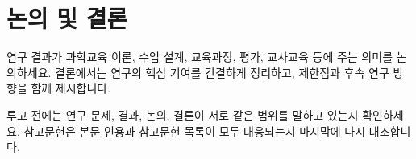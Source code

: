 \section{논의 및 결론}

연구 결과가 과학교육 이론, 수업 설계, 교육과정, 평가, 교사교육 등에 주는 의미를 논의하세요. 결론에서는 연구의 핵심 기여를 간결하게 정리하고, 제한점과 후속 연구 방향을 함께 제시합니다.

투고 전에는 연구 문제, 결과, 논의, 결론이 서로 같은 범위를 말하고 있는지 확인하세요. 참고문헌은 본문 인용과 참고문헌 목록이 모두 대응되는지 마지막에 다시 대조합니다.
